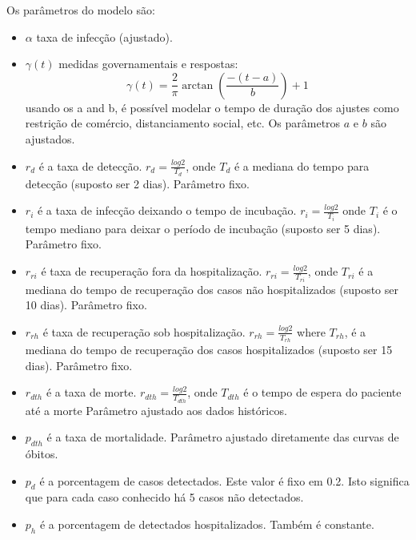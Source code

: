 \documentclass[12pt]{article}
\begin{document}
Os parâmetros do modelo são:
\begin{itemize}
 \item $\alpha$ taxa de infecção (ajustado).
 
 \item $\gamma(t)$ medidas governamentais e respostas:
\[
  \gamma(t) = \frac{2}{\pi} \arctan \left( \frac{-(t - a)}{b}  \right) + 1
\]
usando os  a and b, é possível modelar o tempo de duração dos ajustes como restrição de comércio, distanciamento social, etc. Os parâmetros $a$ e $b$ são ajustados.

\item $r_d$ é a taxa de detecção.   $ r_d = \frac{log 2}{T_d}$,
 onde $T_d$ é a mediana do tempo para detecção (suposto ser 2 dias). Parâmetro fixo.

\item $r_i$ é a taxa de infecção deixando o tempo de incubação. 
  $r_i = \frac{log 2}{T_i}$  onde $T_i$ é o tempo mediano para deixar o período de incubação (suposto ser 5 dias).  Parâmetro fixo.

\item $r_{ri}$ é taxa de recuperação fora da hospitalização. 
   $r_{ri} = \frac{log 2}{T_{ri}}$, onde $T_{ri}$ é a mediana do tempo de recuperação dos casos não hospitalizados (suposto ser 10 dias). Parâmetro fixo.

\item $r_{rh}$ é taxa de recuperação sob hospitalização.
$r_{rh} = \frac{log 2}{T_{rh}}$ where $T_{rh}$, é a mediana do tempo de recuperação dos casos  hospitalizados (suposto ser 15 dias). Parâmetro fixo.

\item $r_{dth}$ é a taxa de morte.
 $r_{dth} = \frac{log 2}{T_{dth}}$, onde $T_{dth}$ é o tempo de espera do paciente até a morte  Parâmetro ajustado aos dados históricos.

\item $p_{dth}$ é a taxa de mortalidade. Parâmetro ajustado diretamente das curvas de óbitos.

\item $p_d$ é a porcentagem de casos detectados. Este valor é fixo em 0.2. Isto significa que para cada caso conhecido há 5 casos não detectados. 

\item $p_h$ é a porcentagem de detectados hospitalizados. Também é constante. 

\end{itemize}
\end{document}

